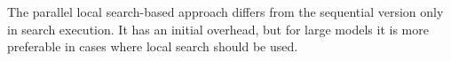 The parallel local search-based approach differs from the sequential version only in search execution. It has an initial overhead, but for large models it is more preferable in cases where local search should be used.







